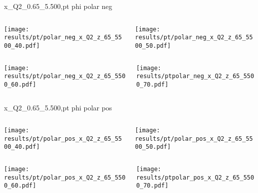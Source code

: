 \begin{frame}{x\_Q2\_0.65\_5.500,pt phi polar neg}
\begin{columns}
\begin{column}[T]{0.5\textwidth}
\texttt{[image: results/pt/polar\_neg\_x\_Q2\_z\_65\_5500\_40.pdf]}
\end{column}
\begin{column}[T]{0.5\textwidth}
\texttt{[image: results/pt/polar\_neg\_x\_Q2\_z\_65\_5500\_50.pdf]}
\end{column}
\end{columns}
\begin{columns}
\begin{column}[T]{0.5\textwidth}
\texttt{[image: results/pt/polar\_neg\_x\_Q2\_z\_65\_5500\_60.pdf]}
\end{column}
\begin{column}[T]{0.5\textwidth}
\texttt{[image: results/ptpolar\_neg\_x\_Q2\_z\_65\_5500\_70.pdf]}
\end{column}
\end{columns}
\end{frame}
\begin{frame}{x\_Q2\_0.65\_5.500,pt phi polar pos}
\begin{columns}
\begin{column}[T]{0.5\textwidth}
\texttt{[image: results/pt/polar\_pos\_x\_Q2\_z\_65\_5500\_40.pdf]}
\end{column}
\begin{column}[T]{0.5\textwidth}
\texttt{[image: results/pt/polar\_pos\_x\_Q2\_z\_65\_5500\_50.pdf]}
\end{column}
\end{columns}
\begin{columns}
\begin{column}[T]{0.5\textwidth}
\texttt{[image: results/pt/polar\_pos\_x\_Q2\_z\_65\_5500\_60.pdf]}
\end{column}
\begin{column}[T]{0.5\textwidth}
\texttt{[image: results/ptpolar\_pos\_x\_Q2\_z\_65\_5500\_70.pdf]}
\end{column}
\end{columns}
\end{frame}
